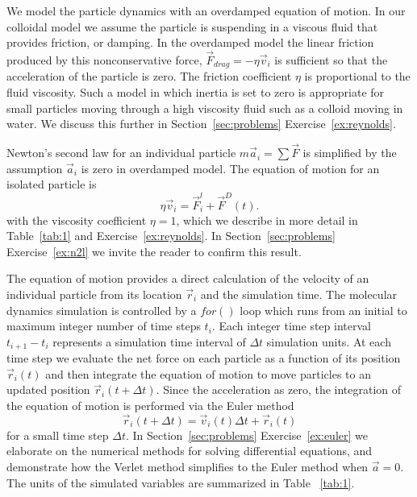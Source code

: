 \documentclass[twocolumn,preprintnumbers,amsmath,amssymb,aps,prx]{revtex4}
\begin{document}
We model the 
particle dynamics 
with an overdamped
equation of motion.
In our colloidal model we assume
the particle is suspending in a viscous fluid
that provides friction, or damping.
In the overdamped model the
linear friction produced by this 
nonconservative force,
$\vec{F}_{drag} = -\eta \vec{v}_i$ is
sufficient so that
the acceleration of the particle is zero.
The friction coefficient $\eta$
is proportional to the fluid viscosity.
Such a model in which inertia is set to zero
is appropriate for small particles
moving through a high viscosity fluid
such as a colloid moving in water.
We discuss this further in 
Section~\ref{sec:problems} Exercise~\ref{ex:reynolds}. %

Newton's second law for an individual particle
$m \vec{a}_i = \sum \vec{F}$ is simplified
by the assumption $\vec{a}_i$ is zero in overdamped model.
The equation of motion for an isolated particle is
\begin{equation}
  \eta \vec{v}_i = \vec{F}^l_{i} + \vec{F}^{D}(t).
    \label{eq:motion}
\end{equation}
with the viscosity coefficient $\eta = 1$,
which we describe in more detail in Table~\ref{tab:1}
and Exercise~\ref{ex:reynolds}.
In Section~\ref{sec:problems} Exercise~\ref{ex:n2l}
we invite the reader to confirm this result.

The equation of motion provides a direct calculation of the velocity
of an individual particle from its location $\vec{r}_i$ %
and the simulation time.
The molecular dynamics simulation is controlled by a $for()$ loop
 which runs from an initial to maximum integer number of time steps $t_i$.
Each integer time step interval $t_{i+1}-t_i$
represents a simulation time interval of $\Delta t$ 
simulation units.  %
At each time step
we evaluate the net force on each particle as a function of its position
$\vec{r}_i(t)$
and then integrate
the equation of motion to move particles
to an updated position
$\vec{r}_i(t+\Delta t)$.
%
Since the acceleration as zero,
the integration of the equation of motion
is performed via 
the Euler method 
\begin{equation}
  \vec{r}_i(t+\Delta t) = \vec{v}_i(t) \Delta t + \vec{r}_i(t)
    \label{eq:euler}
\end{equation}
for a small time step $\Delta t$.
In Section~\ref{sec:problems} Exercise~\ref{ex:euler}
we elaborate on
the numerical methods for 
solving differential equations,
and demonstrate how the Verlet method
simplifies to the Euler method when $\vec{a}=0$.
%
The units of the simulated variables are summarized in Table ~\ref{tab:1}.
\end{document}

